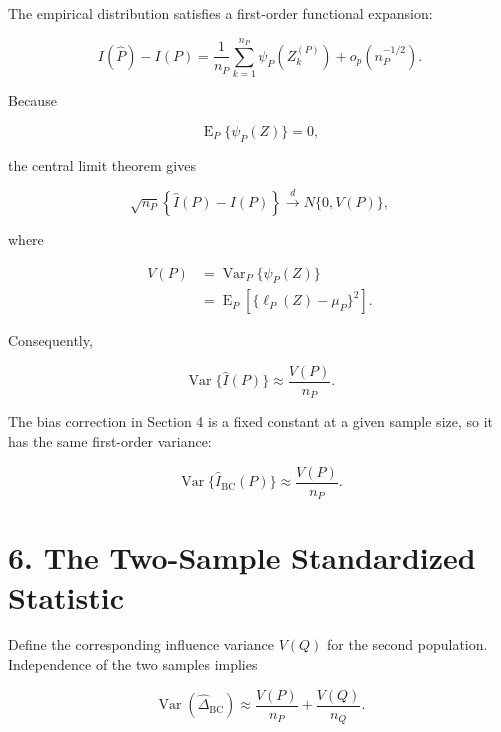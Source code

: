 \documentclass[
  11pt]{article}
\let\originalsection\section
\renewcommand{\section}{\clearpage\originalsection}
\begin{document}
The empirical distribution satisfies a first-order functional expansion:

\begin{equation}
I(\widehat P)-I(P)
=\frac{1}{n_P}\sum_{k=1}^{n_P}\psi_P(Z_k^{(P)})
+o_p(n_P^{-1/2}).
\end{equation}

Because

\begin{equation}
\operatorname E_P\{\psi_P(Z)\}=0,
\end{equation}

the central limit theorem gives

\begin{equation}
\sqrt{n_P}\left\{\widehat I(P)-I(P)\right\}
\overset{d}{\longrightarrow}
N\{0,V(P)\},
\end{equation}

where

\begin{equation}
\begin{aligned}
V(P)
&=\operatorname{Var}_P\{\psi_P(Z)\}\\
&=\operatorname E_P\left[\{\ell_P(Z)-\mu_P\}^2\right].
\end{aligned}
\end{equation}

Consequently,

\begin{equation}
\operatorname{Var}\{\widehat I(P)\}
\approx\frac{V(P)}{n_P}.
\end{equation}

The bias correction in Section 4 is a fixed constant at a given sample
size, so it has the same first-order variance:

\begin{equation}
\operatorname{Var}\{\widehat I_{\mathrm{BC}}(P)\}
\approx\frac{V(P)}{n_P}.
\end{equation}

\section{6. The Two-Sample Standardized
Statistic}\label{the-two-sample-standardized-statistic}

Define the corresponding influence variance \(V(Q)\) for the second
population. Independence of the two samples implies

\begin{equation}
\operatorname{Var}(\widehat\Delta_{\mathrm{BC}})
\approx
\frac{V(P)}{n_P}+\frac{V(Q)}{n_Q}.
\end{equation}
\end{document}

